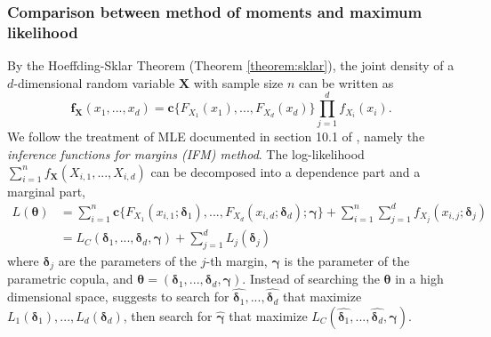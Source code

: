 \subsubsection{Comparison between method of moments and maximum likelihood}
\label{subsec:maximum-likelihood-estimation}
By the Hoeffding-Sklar Theorem (Theorem \ref{theorem:sklar}), the
joint density of a $d$-dimensional random variable $\bm{X}$ with
sample size $n$ can be written as 
\begin{equation*}
    \bm{f}_{\bm{X}}(x_1, ..., x_d) = \bm{c}\{F_{X_1}(x_1), ...,
    F_{X_d}(x_d)\} \prod_{j=1}^d f_{X_i}(x_i). 
    \end{equation*}
We follow the treatment of MLE documented in section 10.1 of
\citet{joe1997multivariate}, namely the {\em inference functions for
margins (IFM) method}.
The log-likelihood $\sum^n_{i=1}f_{\bm{X}}(X_{i,1}, ..., X_{i,d})$ can be decomposed into a dependence part and a marginal part,
\begin{align*}
    L(\bm{\theta}) &= \sum_{i=1}^n \bm{c}\{F_{X_1}(x_{i,1};\bm{\delta}_1), ..., F_{X_d}(x_{i,d}; \bm{\delta}_d);\bm{\gamma}\}
    + \sum_{i=1}^n \sum_{j=1}^d f_{X_j}(x_{i,j};\bm{\delta}_j)\\
    &= L_C(\bm{\delta}_1, ..., \bm{\delta}_d, \bm{\gamma}) + \sum_{j=1}^d L_j(\bm{\delta}_j)
    \end{align*}
where $\bm{\delta}_j$ are the parameters of the $j$-th margin, $\bm{\gamma}$ is the parameter of the parametric copula, and
$\bm{\theta} = (\bm{\delta}_1,..., \bm{\delta}_d, \bm{\gamma})$.
Instead of searching the $\bm{\theta}$ in a high dimensional space, \citet{joe1997multivariate} suggests to
search for $\hat{\bm{\delta}_1},..., \hat{\bm{\delta}_d}$ that maximize $L_1(\bm{\delta}_1), ..., L_d(\bm{\delta}_d)$,
then search for $\hat{\bm{\gamma}}$ that maximize $L_C(\hat{\bm{\delta}_1},..., \hat{\bm{\delta}_d}, \bm{\gamma})$.


